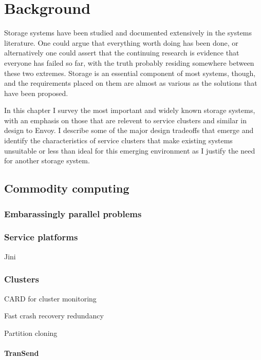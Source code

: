 \chapter{Background}

Storage systems have been studied and documented extensively in the systems literature. One could argue that everything worth doing has been done, or alternatively one could assert that the continuing research is evidence that everyone has failed so far, with the truth probably residing somewhere between these two extremes. Storage is an essential component of most systems, though, and the requirements placed on them are almost as various as the solutions that have been proposed.

In this chapter I survey the most important and widely known storage systems, with an emphasis on those that are relevent to service clusters and similar in design to Envoy. I describe some of the major design tradeoffs that emerge and identify the characteristics of service clusters that make existing systems unsuitable or less than ideal for this emerging environment as I justify the need for another storage system.

\section{Commodity computing}

\subsection{Embarassingly parallel problems}

\subsection{Service platforms}

Jini

\subsection{Clusters}
CARD for cluster monitoring\cite{anderson97}

Fast crash recovery \vs redundancy\cite{baker94}

Partition cloning \cite{rauch}

\subsubsection{TranSend}

